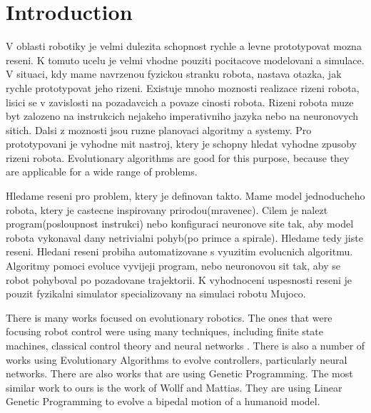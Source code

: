 \documentclass{ExcelAtFIT}
\affiliation{*%
  \href{mailto:herout@fit.vutbr.cz}{herout@fit.vutbr.cz},
  \textit{Faculty of Information Technology, Brno University of Technology}}
\begin{document}
\startdocument



\section{Introduction}

V oblasti robotiky je velmi dulezita schopnost rychle a levne prototypovat mozna reseni.
K tomuto ucelu je velmi vhodne pouziti pocitacove modelovani a simulace.
V situaci, kdy mame navrzenou fyzickou stranku robota, nastava otazka, jak rychle prototypovat jeho rizeni.
Existuje mnoho moznosti realizace rizeni robota, lisici se v zavislosti na pozadavcich a povaze cinosti robota.
Rizeni robota muze byt zalozeno na instrukcich nejakeho imperativniho jazyka nebo na neuronovych sitich.
Dalsi z moznosti jsou ruzne planovaci algoritmy a systemy. 
Pro prototypovani je vyhodne mit nastroj, ktery je schopny hledat vyhodne zpusoby rizeni robota.
Evolutionary algorithms are good for this purpose, because they are applicable for a wide range of problems.

Hledame reseni pro problem, ktery je definovan takto.
Mame model jednoducheho robota, ktery je castecne inspirovany prirodou(mravenec). 
Cilem je nalezt program(posloupnost instrukci) nebo konfiguraci neuronove site tak, aby model robota vykonaval dany netrivialni pohyb(po primce a spirale).
Hledame tedy jiste reseni.
Hledani reseni probiha automatizovane s vyuzitim evolucnich algoritmu.
Algoritmy pomoci evoluce vyvijeji program, nebo neuronovou sit tak, aby se robot pohyboval po pozadovane trajektorii.
K vyhodnoceni uspesnosti reseni je pouzit fyzikalni simulator specializovany na simulaci robotu Mujoco\cite{Todorov2012}.

There is many works focused on evolutionary robotics.
The ones that were focusing robot control were using many techniques, including finite state machines\cite{Hodgins1996}, classical control theory\cite{Mita1984} and neural networks \cite{Reil2002}\cite{Lewis1996}.
There is also a number of works using Evolutionary Algorithms to evolve controllers, particularly neural networks\cite{Randall1992}\cite{Farooq2013}.
There are also works that are using Genetic Programming\cite{Macedo2017}. The most similar work to ours is the work of Wollf and Mattias\cite{Wolff2007}. They are using Linear Genetic Programming to evolve a bipedal motion of a humanoid model.
\end{document}
